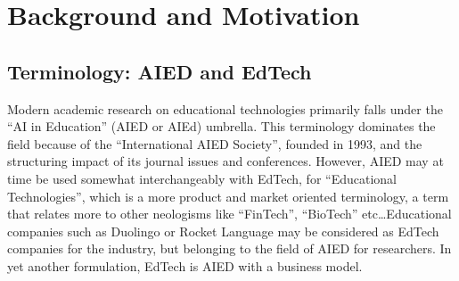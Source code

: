 \section{Background and Motivation}
    \subsection{Terminology: AIED and EdTech}
Modern academic research on educational technologies primarily falls under the ``AI in Education'' (AIED or AIEd) umbrella. This terminology dominates the field because of the ``International AIED Society'', founded in 1993, and the structuring impact of its journal issues and conferences. However, AIED may at time be used somewhat interchangeably with EdTech, for ``Educational Technologies'', which is a more product and market oriented terminology, a term that relates more to other neologisms like ``FinTech'', ``BioTech'' etc\ldots Educational companies such as Duolingo or Rocket Language may be considered as EdTech companies for the industry, but belonging to the field of AIED for researchers. In yet another formulation, EdTech is AIED with a business model.

